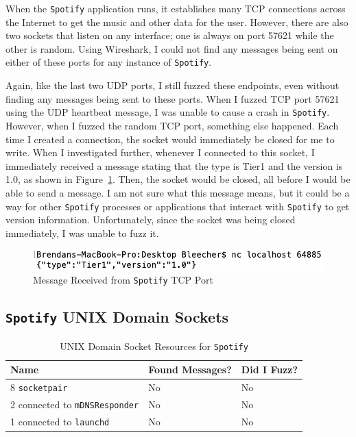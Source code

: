 When the \texttt{Spotify} application runs, it establishes many TCP connections across the Internet to get the music and other data for the user.  However, there are also two sockets that listen on any interface; one is always on port 57621 while the other is random.  Using Wireshark, I could not find any messages being sent on either of these ports for any instance of \texttt{Spotify}.

Again, like the last two UDP ports, I still fuzzed these endpoints, even without finding any messages being sent to these ports.  When I fuzzed TCP port 57621 using the UDP heartbeat message, I was unable to cause a crash in \texttt{Spotify}.  However, when I fuzzed the random TCP port, something else happened.  Each time I created a connection, the socket would immediately be closed for me to write.  When I investigated further, whenever I connected to this socket, I immediately received a message stating that the type is Tier1 and the version is 1.0, as shown in Figure~\ref{fig:spotifyTcpResponse}.  Then, the socket would be closed, all before I would be able to send a message.  I am not sure what this message means, but it could be a way for other \texttt{Spotify} processes or applications that interact with \texttt{Spotify} to get version information.  Unfortunately, since the socket was being closed immediately, I was unable to fuzz it.

\begin{figure}
\centering
\includegraphics[width=1\textwidth]{spotifyMessage.png}
\caption{Message Received from \texttt{Spotify} TCP Port}
\label{fig:spotifyTcpResponse}
\end{figure}

\subsection{\texttt{Spotify} UNIX Domain Sockets}
\label{sec:spotifyUnix}

\begin{table}
\centering
\begin{normalsize}
\begin{tabular}{ l | l | l }
\textbf{Name} & \textbf{Found Messages?} & \textbf{Did I Fuzz?} \\ \hline
8 \texttt{socketpair} & No & No \\ \hline
2 connected to \texttt{mDNSResponder} & No & No \\ \hline
1 connected to \texttt{launchd} & No & No \\ \hline
\end{tabular}
\caption{UNIX Domain Socket Resources for \texttt{Spotify}}
\label{tab:spotifyTcp}
\end{normalsize}
\end{table} 

